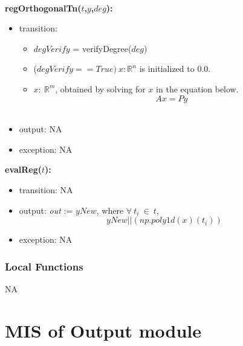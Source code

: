 \documentclass[12pt, titlepage]{article}
\begin{document}
~\newline
~\newline

\noindent \textbf{regOrthogonalTn($t$,$y$,$deg$):}
\begin{itemize}
\item transition: 
\begin{itemize}
	\item $degVerify$ = verifyDegree($deg$)
	\item ($degVerify == True)\  x : \mathbb{R}^n$ is 
	initialized to $0.0$. 
	\item $x :\ \mathbb{R}^m$, obtained by solving for $x$ in the 
	equation below.
		\begin{equation*}
		Ax = Py
		\end{equation*}\\
	\end{itemize}	
	\item output: NA
	
	
	\item exception: NA
\end{itemize}

\noindent \textbf{evalReg($t$):}
\begin{itemize}
	\item transition: NA
	\item output: \textit{out} := $yNew$, where
	$ \forall\ t_i\ \in\ t$,  
	\begin{equation*}
	yNew||(np.poly1d(x)(t_i))
	\end{equation*}
	\item exception: NA
\end{itemize}

  

\subsubsection{Local Functions}

NA


\section{MIS of Output module} \label{mOutput}
\end{document}
